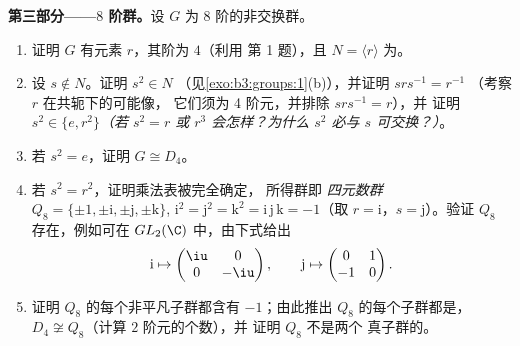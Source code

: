 \begin{problem}
\medskip
\noindent\textbf{第三部分——$8$ 阶群。}设 $G$ 为
        $8$ 阶的非交换群。
\begin{enumerate}[resume]
  \item 证明 $G$ 有元素 $r$，其阶为 $4$（利用
        第 1 题），且 $N = \langle r\rangle$ 为。
  \item 设 $s \notin N$。证明 $s^2 \in N$
        （见\cref{exo:b3:groups:1}(b)），并证明 $srs^{-1} = r^{-1}$
        （考察 $r$ 在共轭下的可能像，
        它们须为 4 阶元，并排除 $srs^{-1} = r$），并
        证明 $s^2 \in \{e, r^2\}$\emph{（若 $s^2 = r$
        或 $r^3$ 会怎样？为什么 $s^2$ 必与 $s$ 可交换？）}。
  \item 若 $s^2 = e$，证明 $G \cong D_4$。
  \item 若 $s^2 = r^2$，证明乘法表被完全确定，
        所得群即
        \emph{四元数群} $Q_8 =
        \{\pm 1, \pm \mathrm i, \pm \mathrm j, \pm \mathrm k\}$,
        $\mathrm i^2 = \mathrm j^2 = \mathrm k^2 = \mathrm i\,
        \mathrm j\,\mathrm k = -1$（取 $r = \mathrm i$，$s =
        \mathrm j$）。验证 $Q_8$ 存在，例如可在
        $GL_2(\C)$ 中，由下式给出
        \[
        \mathrm i \mapsto \begin{pmatrix} \iu & 0\\ 0 & -\iu
        \end{pmatrix},
        \qquad
        \mathrm j \mapsto \begin{pmatrix} 0 & 1\\ -1 & 0
        \end{pmatrix}.
        \]
  \item 证明 $Q_8$ 的每个非平凡子群都含有
        $-1$；由此推出 $Q_8$ 的每个子群都是，
        $D_4 \not\cong Q_8$（计算 $2$ 阶元的个数），并
        证明 $Q_8$ 不是两个
        真子群的。
\end{enumerate}


\end{problem}
